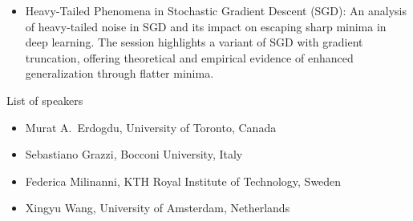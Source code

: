 \begin{session}
\begin{itemize}
 \item
 Heavy-Tailed Phenomena in Stochastic Gradient Descent (SGD): An analysis of heavy-tailed noise in SGD and its impact on escaping sharp minima in deep learning. The session highlights a variant of SGD with gradient truncation, offering theoretical and empirical evidence of enhanced generalization through flatter minima.
 \end{itemize}
 \medskip
 List of speakers
 \begin{itemize}
 \item Murat A.~Erdogdu, University of Toronto, Canada
 \item Sebastiano Grazzi, Bocconi University, Italy
 \item Federica Milinanni, KTH Royal Institute of Technology, Sweden
 \item Xingyu Wang,  University of Amsterdam, Netherlands
 \end{itemize}
\end{session}



\clearpage

